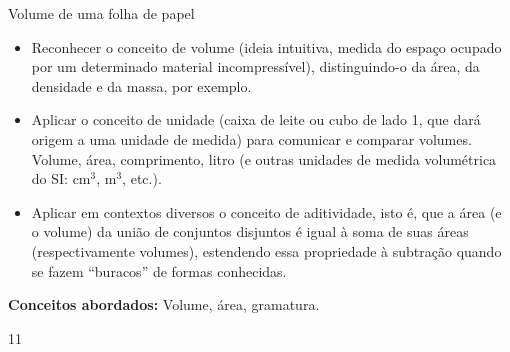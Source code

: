 \mainmatter

\label{\detokenize{GE504:medidas-em-geometria-espacial}}\label{\detokenize{GE504::doc}}

\def\currentcolor{session1}
\begin{objectives}{Volume de uma folha de papel}
{
\begin{itemize}
\item {} 
Reconhecer o conceito de volume (ideia intuitiva, medida do espaço ocupado por um determinado material incompressível), distinguindo-o da área, da densidade e da massa, por exemplo.

\item {} 
Aplicar o conceito de unidade (caixa de leite ou cubo de lado 1, que dará origem a uma unidade de medida) para comunicar e comparar volumes. Volume, área, comprimento, litro (e outras unidades de medida volumétrica do SI: cm\(^3\), m\(^3\), etc.).

\item {} 
Aplicar em contextos diversos o conceito de aditividade, isto é, que a área (e o volume) da união de conjuntos disjuntos é igual à soma de suas áreas (respectivamente volumes), estendendo essa propriedade à subtração quando se fazem “buracos” de formas conhecidas.

\end{itemize}

\textbf{Conceitos abordados:} Volume, área, gramatura.
}{1}{1}
\end{objectives}
